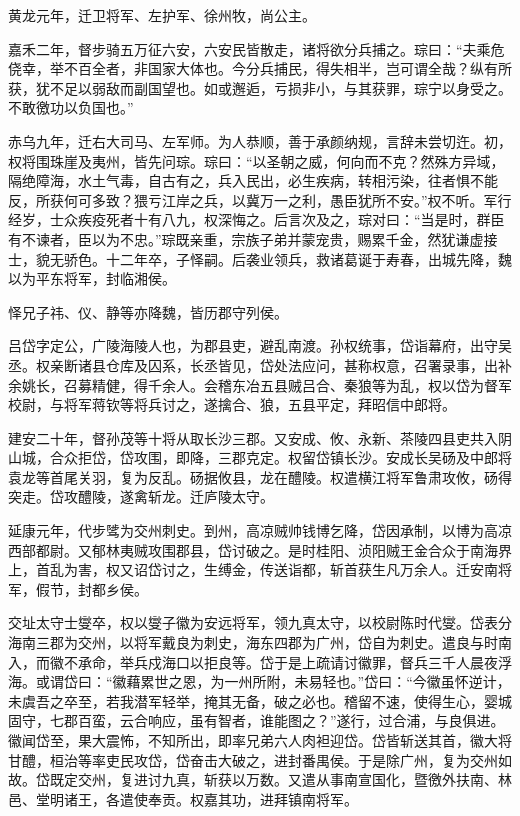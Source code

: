 \documentclass[12pt,UTF8]{ctexbook}
\begin{document}
黄龙元年，迁卫将军、左护军、徐州牧，尚公主。

嘉禾二年，督步骑五万征六安，六安民皆散走，诸将欲分兵捕之。琮曰：“夫乘危侥幸，举不百全者，非国家大体也。今分兵捕民，得失相半，岂可谓全哉？纵有所获，犹不足以弱敌而副国望也。如或邂逅，亏损非小，与其获罪，琮宁以身受之。不敢徼功以负国也。”

赤乌九年，迁右大司马、左军师。为人恭顺，善于承颜纳规，言辞未尝切迕。初，权将围珠崖及夷州，皆先问琮。琮曰：“以圣朝之威，何向而不克？然殊方异域，隔绝障海，水土气毒，自古有之，兵入民出，必生疾病，转相污染，往者惧不能反，所获何可多致？猥亏江岸之兵，以冀万一之利，愚臣犹所不安。”权不听。军行经岁，士众疾疫死者十有八九，权深悔之。后言次及之，琮对曰：“当是时，群臣有不谏者，臣以为不忠。”琮既亲重，宗族子弟并蒙宠贵，赐累千金，然犹谦虚接士，貌无骄色。十二年卒，子怿嗣。后袭业领兵，救诸葛诞于寿春，出城先降，魏以为平东将军，封临湘侯。

怿兄子祎、仪、静等亦降魏，皆历郡守列侯。

吕岱字定公，广陵海陵人也，为郡县吏，避乱南渡。孙权统事，岱诣幕府，出守吴丞。权亲断诸县仓库及囚系，长丞皆见，岱处法应问，甚称权意，召署录事，出补余姚长，召募精健，得千余人。会稽东冶五县贼吕合、秦狼等为乱，权以岱为督军校尉，与将军蒋钦等将兵讨之，遂擒合、狼，五县平定，拜昭信中郎将。

建安二十年，督孙茂等十将从取长沙三郡。又安成、攸、永新、茶陵四县吏共入阴山城，合众拒岱，岱攻围，即降，三郡克定。权留岱镇长沙。安成长吴砀及中郎将袁龙等首尾关羽，复为反乱。砀据攸县，龙在醴陵。权遣横江将军鲁肃攻攸，砀得突走。岱攻醴陵，遂禽斩龙。迁庐陵太守。

延康元年，代步骘为交州刺史。到州，高凉贼帅钱博乞降，岱因承制，以博为高凉西部都尉。又郁林夷贼攻围郡县，岱讨破之。是时桂阳、浈阳贼王金合众于南海界上，首乱为害，权又诏岱讨之，生缚金，传送诣都，斩首获生凡万余人。迁安南将军，假节，封都乡侯。

交址太守士燮卒，权以燮子徽为安远将军，领九真太守，以校尉陈时代燮。岱表分海南三郡为交州，以将军戴良为刺史，海东四郡为广州，岱自为刺史。遣良与时南入，而徽不承命，举兵戍海口以拒良等。岱于是上疏请讨徽罪，督兵三千人晨夜浮海。或谓岱曰：“徽藉累世之恩，为一州所附，未易轻也。”岱曰：“今徽虽怀逆计，未虞吾之卒至，若我潜军轻举，掩其无备，破之必也。稽留不速，使得生心，婴城固守，七郡百蛮，云合响应，虽有智者，谁能图之？”遂行，过合浦，与良俱进。徽闻岱至，果大震怖，不知所出，即率兄弟六人肉袒迎岱。岱皆斩送其首，徽大将甘醴，桓治等率吏民攻岱，岱奋击大破之，进封番禺侯。于是除广州，复为交州如故。岱既定交州，复进讨九真，斩获以万数。又遣从事南宣国化，暨徼外扶南、林邑、堂明诸王，各遣使奉贡。权嘉其功，进拜镇南将军。
\end{document}
